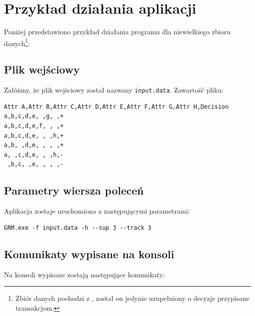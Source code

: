 \documentclass[a4paper,10pt]{article}
\begin{document}
\section{Przykład działania aplikacji} \label{sec:example}
Poniżej przedstawiono przykład działania programu dla niewielkiego zbioru danych\footnote{Zbiór danych pochodzi z \cite{grm}, został on jedynie uzupełniony o decyzje przypisane transakcjom.}:

 \subsection{Plik wejściowy}
 Załóżmy, że plik wejściowy został nazwany \verb+input.data+.
 Zawartość pliku:

\begin{verbatim}
Attr A,Attr B,Attr C,Attr D,Attr E,Attr F,Attr G,Attr H,Decision
a,b,c,d,e, ,g, ,+
a,b,c,d,e,f, , ,+
a,b,c,d,e, , ,h,+
a,b, ,d,e, , , ,+
a, ,c,d,e, , ,h,-
 ,b,c, ,e, , , ,-
\end{verbatim}


 \subsection{Parametry wiersza poleceń}
 Aplikacja zostaje uruchomiona z następującymi parametrami:
 
\begin{verbatim}
GRM.exe -f input.data -h --sup 3 --track 3
\end{verbatim}


 \subsection{Komunikaty wypisane na konsoli}
 Na konsoli wypisane zostają następujące komunikaty:
 
\end{document}
